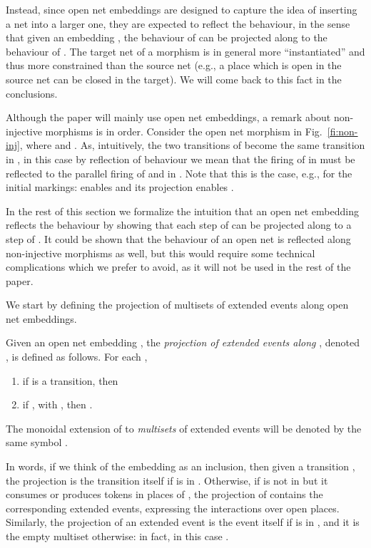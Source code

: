 \documentclass{LMCS}
\begin{document}
Instead, since open net embeddings are designed to capture the idea of
inserting a net into a larger one, they are expected to reflect the
behaviour, in the sense that given an embedding , the
behaviour of  can be projected along  to the
behaviour of .
The target net of a morphism is in general more ``instantiated'' and
thus more constrained than the source net (e.g., a place which is open
in the source net can be closed in the target).
We will come back to this fact in the conclusions.

Although the paper will mainly use open net embeddings, a remark about
non-injective morphisms is in order. Consider the open net morphism
 in Fig.~\ref{fi:non-inj}, where  and
. As, intuitively, the two transitions of
 become the same transition in , in this case by reflection
of behaviour we mean that the firing of  in  must be reflected
to the parallel firing of  and  in .  Note that this is
the case, e.g., for the initial markings:  enables  and its
projection  enables . 

In the rest of this section we formalize the intuition that an open
net embedding  reflects the behaviour by showing that
each step of  can be projected along  to a step of . 
It could be shown that the behaviour of an open net is reflected
along non-injective morphisms as well,  but this would require
some technical complications which we prefer to avoid, as it will not
be used in the rest of the paper.




We start by defining the projection of multisets of extended events
along open net embeddings.


\begin{defi}
  Given an open net embedding , the \emph{projection of
    extended events along }, denoted  , is defined as
    follows. For each  ,

  \begin{enumerate}[]
    
  \item if  is a transition, then
    
    \smallskip
  \item if , with ,
then .
  \end{enumerate}
  The monoidal extension of  to \emph{multisets}
  of extended events will be denoted by the same symbol 
  .
\end{defi}  

In words, if we think of the embedding  as an inclusion,
then given a transition , the projection  is the
transition itself if  is in . Otherwise, if  is not in 
but it consumes or produces tokens in places of , the projection of
 contains the corresponding extended events, expressing the
interactions over open places.
Similarly, the projection of an extended event  is
the event itself if  is in , and it is the empty multiset
otherwise: in fact, in this case .
\end{document}
